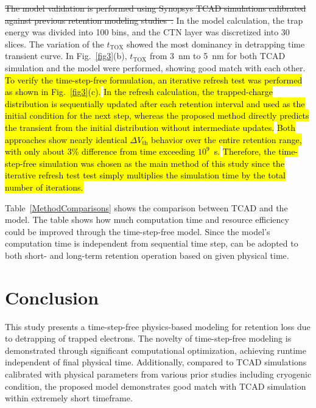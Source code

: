 \documentclass[journal,twoside,web]{ieeecolor}
\begin{document}
\sout{The model validation is performed using Synopsys TCAD simulations calibrated against previous retention modeling studies~\hbox{\cite{Han.TED2026, Jin.TED2025}}.}
In the model calculation, the trap energy was divided into 100 bins, and the CTN layer was discretized into 30 slices.
The variation of the $t_\text{TOX}$ showed the most dominancy in detrapping time transient curve.
In Fig.~\ref{fig3}(b), $t_\text{TOX}$ from 3~nm to 5~nm for both TCAD simulation and the model were performed, showing good match with each other.
\hl{To verify the time-step-free formulation, an iterative refresh test was performed as shown in Fig.~\hbox{\ref{fig3}(c)}.}
\hl{In the refresh calculation, the trapped-charge distribution is sequentially updated after each retention interval and used as the initial condition for the next step, whereas the proposed method directly predicts the transient from the initial distribution without intermediate updates.}
\hl{Both approaches show nearly identical $\Delta V_\text{th}$ behavior over the entire retention range, with only about 3\% difference from time exceeding $10^9$~s.}
\hl{Therefore, the time-step-free simulation was chosen as the main method of this study since the iterative refresh test test simply multiplies the simulation time by the total number of iterations.}

Table~\ref{MethodComparisons} shows the comparison between TCAD and the model.
The table shows how much computation time and resource efficiency could be improved through the time-step-free model.
Since the model's computation time is independent from sequential time step, can be adopted to both short- and long-term retention operation based on given physical time.

\section{Conclusion}
This study presents a time-step-free physics-based modeling for retention loss due to detrapping of trapped electrons. 
The novelty of time-step-free modeling is demonstrated through significant computational optimization, achieving runtime independent of final physical time.
Additionally, compared to TCAD simulations calibrated with physical parameters from various prior studies including cryogenic condition, the proposed model demonstrates good match with TCAD simulation within extremely short timeframe. 
\end{document}
